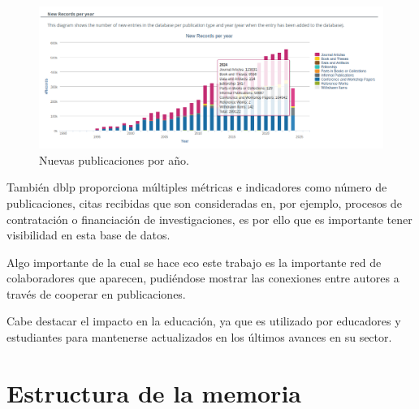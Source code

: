 \documentclass[a4paper, 12pt]{book}
\begin{document}
\begin{figure}[h]
    \centering
    \includegraphics[width=16cm, keepaspectratio]{img/dblp_new_records_per_year.png}
    \caption{Nuevas publicaciones por año.}
    \label{figura:progresion_base_dblp}
 \end{figure}

También dblp proporciona múltiples métricas e indicadores como número de publicaciones, citas recibidas que son consideradas en, por ejemplo, procesos de contratación o financiación de investigaciones, es por ello que es importante tener visibilidad en esta base de datos.

Algo importante de la cual se hace eco este trabajo es la importante red de colaboradores que aparecen, pudiéndose mostrar las conexiones entre autores a través de cooperar en publicaciones.

Cabe destacar el impacto en la educación, ya que es utilizado por educadores y estudiantes para mantenerse actualizados en los últimos avances en su sector.


\section{Estructura de la memoria}
\label{sec:estructura}
\end{document}
